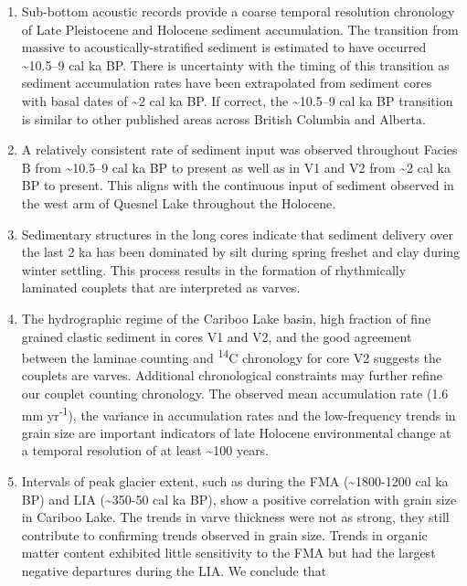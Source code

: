 \documentclass[
  letterpaper,
  DIV=11,
  numbers=noendperiod]{scrartcl}
\providecommand{\tightlist}{%
  \setlength{\itemsep}{0pt}\setlength{\parskip}{0pt}}\usepackage{longtable,booktabs,array}
\begin{document}
\begin{enumerate}
\def\labelenumi{\arabic{enumi}.}
\tightlist
\item
  Sub-bottom acoustic records provide a coarse temporal resolution
  chronology of Late Pleistocene and Holocene sediment accumulation. The
  transition from massive to acoustically-stratified sediment is
  estimated to have occurred \textasciitilde10.5--9 cal ka BP. There is
  uncertainty with the timing of this transition as sediment
  accumulation rates have been extrapolated from sediment cores with
  basal dates of \textasciitilde2 cal ka BP. If correct, the
  \textasciitilde10.5--9 cal ka BP transition is similar to other
  published areas across British Columbia and Alberta.
\item
  A relatively consistent rate of sediment input was observed throughout
  Facies B from \textasciitilde10.5--9 cal ka BP to present as well as
  in V1 and V2 from \textasciitilde2 cal ka BP to present. This aligns
  with the continuous input of sediment observed in the west arm of
  Quesnel Lake throughout the Holocene.
\item
  Sedimentary structures in the long cores indicate that sediment
  delivery over the last 2 ka has been dominated by silt during spring
  freshet and clay during winter settling. This process results in the
  formation of rhythmically laminated couplets that are interpreted as
  varves.
\item
  The hydrographic regime of the Cariboo Lake basin, high fraction of
  fine grained clastic sediment in cores V1 and V2, and the good
  agreement between the laminae counting and \textsuperscript{14}C
  chronology for core V2 suggests the couplets are varves. Additional
  chronological constraints may further refine our couplet counting
  chronology. The observed mean accumulation rate (1.6 mm
  yr\textsuperscript{-1}), the variance in accumulation rates and the
  low-frequency trends in grain size are important indicators of late
  Holocene environmental change at a temporal resolution of at least
  \textasciitilde100 years.
\item
  Intervals of peak glacier extent, such as during the FMA
  (\textasciitilde1800-1200 cal ka BP) and LIA (\textasciitilde350-50
  cal ka BP), show a positive correlation with grain size in Cariboo
  Lake. The trends in varve thickness were not as strong, they still
  contribute to confirming trends observed in grain size. Trends in
  organic matter content exhibited little sensitivity to the FMA but had
  the largest negative departures during the LIA. We conclude that

\end{enumerate}
\end{document}
